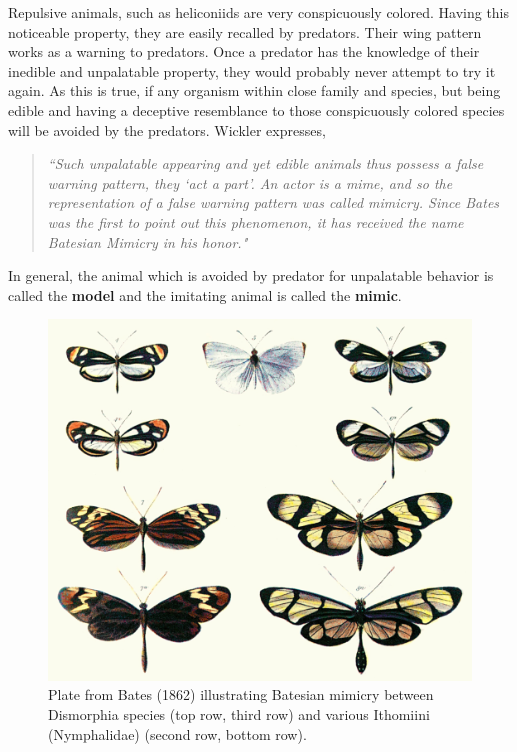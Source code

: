 \documentclass[letterpaper]{article}
\numberwithin{equation}{section}
\begin{document}
Repulsive animals, such as heliconiids are very conspicuously colored. Having this noticeable property, they are easily recalled by predators. Their wing pattern works as a warning to predators. Once a predator has the knowledge of their inedible and unpalatable property, they would probably never attempt to try it again. As this is true, if any organism within close family and species, but being edible and having a deceptive resemblance to those conspicuously colored species will be avoided by the predators. Wickler \cite{wickler1986} expresses,
\begin{quote}
\textsl{``Such unpalatable appearing and yet edible animals thus possess a false warning pattern, they `act a part'. An actor is a mime, and so the representation of a false warning pattern was called \textit{mimicry}. Since Bates was the first to point out this phenomenon, it has received the name \textit{Batesian Mimicry} in his honor."}
\end{quote}
In general, the animal which is avoided by predator for unpalatable behavior is called the \textbf{model} and the imitating animal is called the \textbf{mimic}.

\begin{figure}[H]
	\centering
	\includegraphics[scale=1]{../tex/images/Batesplate_ArM}
	\caption[Plate from Bates (1862) illustrating Batesian mimicry]{Plate from Bates (1862) illustrating Batesian mimicry between Dismorphia species (top row, third row) and various Ithomiini (Nymphalidae) (second row, bottom row). \cite{bates1862}}
	\label{fig:batesian-butterfly}
\end{figure}
\end{document}
